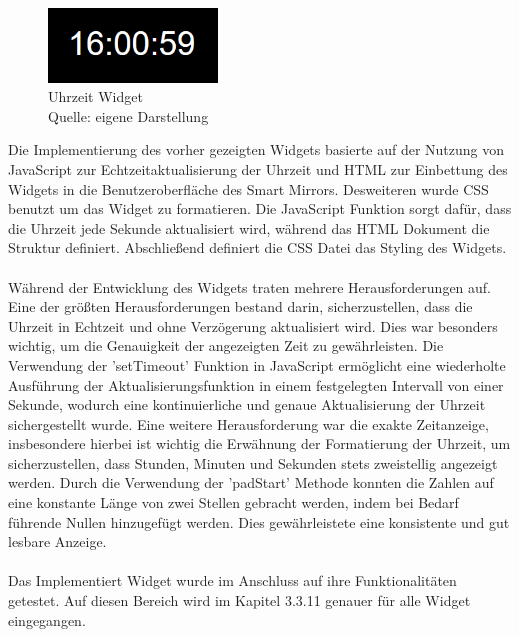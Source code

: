 \begin{figure}[h]
    \centering
    \includegraphics[width=0.4\textwidth]{pictures/time_widget.png}
  \captionsetup{justification=centering, labelformat=simple, singlelinecheck=false}
    \caption[Uhrzeit Widget]{Uhrzeit Widget\\ Quelle: eigene Darstellung}
\end{figure}

\noindent
Die Implementierung des vorher gezeigten Widgets basierte auf der Nutzung von JavaScript zur Echtzeitaktualisierung der Uhrzeit und HTML zur Einbettung des Widgets in die Benutzeroberfläche des Smart Mirrors. Desweiteren wurde CSS benutzt um das Widget zu formatieren. Die JavaScript Funktion sorgt dafür, dass die Uhrzeit jede Sekunde aktualisiert wird, während das HTML Dokument die Struktur definiert. Abschließend definiert die CSS Datei das Styling des Widgets. \\ \\
\noindent
Während der Entwicklung des Widgets traten mehrere Herausforderungen auf. Eine der größten Herausforderungen bestand darin, sicherzustellen, dass die Uhrzeit in Echtzeit und ohne Verzögerung aktualisiert wird. Dies war besonders wichtig, um die Genauigkeit der angezeigten Zeit zu gewährleisten. Die Verwendung der 'setTimeout' Funktion in JavaScript ermöglicht eine wiederholte Ausführung der Aktualisierungsfunktion in einem festgelegten Intervall von einer Sekunde, wodurch eine kontinuierliche und genaue Aktualisierung der Uhrzeit sichergestellt wurde.
Eine weitere Herausforderung war die exakte Zeitanzeige, insbesondere hierbei ist wichtig die Erwähnung der Formatierung der Uhrzeit, um sicherzustellen, dass Stunden, Minuten und Sekunden stets zweistellig angezeigt werden. Durch die Verwendung der 'padStart' Methode konnten die Zahlen auf eine konstante Länge von zwei Stellen gebracht werden, indem bei Bedarf führende Nullen hinzugefügt werden. Dies gewährleistete eine konsistente und gut lesbare Anzeige.\\ \\
\noindent
Das Implementiert Widget wurde im Anschluss auf ihre Funktionalitäten getestet. Auf diesen Bereich wird im Kapitel 3.3.11 genauer für alle Widget eingegangen.


